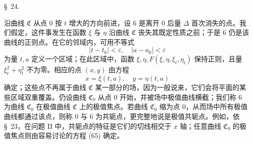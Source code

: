 \documentclass[11pt,a4paper,leqno]{article}
\begin{document}
\begin{center}{\large \S~24.}\end{center}

沿曲线 $\mathfrak{C}$ 从点 0 按 $t$ 增大的方向前进，设 6 是离开 0 后量 $\Delta$ 首次消失的点。我们假定，这件事发生在函数 $\xi$ 与 $\eta$ 沿曲线 $\mathfrak{C}$ 丧失其既定性质之前；于是 6 仍是该曲线的正则点。在它的邻域内，可用不等式
\[
|t-t_6|<\varepsilon,\quad |a-a_0|<\varepsilon
\]
为量 $t,a$ 定义一个区域；在此区域中，函数 $\xi,\eta,F(\xi,\eta,\xi_t,\eta_t)$ 保持正则，且量 $\xi_t^2+\eta_t^2$ 不为零。相应的点 $(x,y)$ 由方程
\[
x=\xi(t,a),\quad y=\eta(t,a)
\]
确定；这些点不再属于曲线 $\mathfrak{C}$ 某一部分的场，因为一般说来，它们会将平面的某些区域双重覆盖。仍设曲线 $\mathfrak{C}_0$ 从点 0 开始，并被场中极值曲线横截；我们称 6 为曲线 $\mathfrak{C}_0$ 在极值曲线 $\mathfrak{C}$ 上的极值焦点。若曲线 $\mathfrak{C}_0$ 缩为点 0，从而场中所有极值曲线都通过该点，则称 0 与 6 为共轭点，更完整地说是极值共轭点。例如，依 \S~23，在问题 II 中，共轭点的特征是它们的切线相交于 $x$ 轴；任意曲线 $\mathfrak{C}_0$ 的极值焦点则由容易讨论的方程 (65) 确定。
\end{document}
